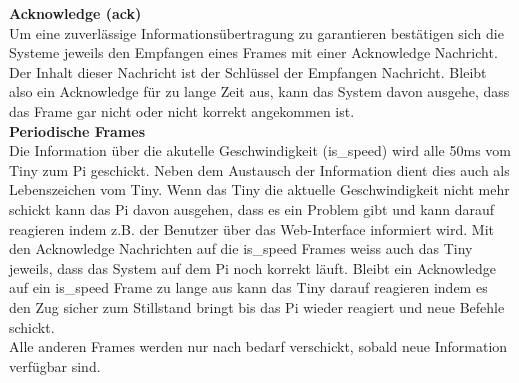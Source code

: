 \documentclass[../../main.tex]{subfiles}
\begin{document}
        \pagebreak

        \textbf{Acknowledge (ack)}\\
        Um eine zuverlässige Informationsübertragung zu garantieren bestätigen sich die Systeme jeweils den Empfangen eines Frames mit einer Acknowledge Nachricht. Der Inhalt dieser Nachricht ist der Schlüssel der Empfangen Nachricht. Bleibt also ein Acknowledge für zu lange Zeit aus, kann das System davon ausgehe, dass das Frame gar nicht oder nicht korrekt angekommen ist.\\

        \textbf{Periodische Frames}\\
        Die Information über die akutelle Geschwindigkeit (is\_speed) wird alle 50ms vom Tiny zum Pi geschickt. Neben dem Austausch der Information dient dies auch als Lebenszeichen vom Tiny. Wenn das Tiny die aktuelle Geschwindigkeit nicht mehr schickt kann das Pi davon ausgehen, dass es ein Problem gibt und kann darauf reagieren indem z.B. der Benutzer über das Web-Interface informiert wird. Mit den Acknowledge Nachrichten auf die is\_speed Frames weiss auch das Tiny jeweils, dass das System auf dem Pi noch korrekt läuft. Bleibt ein Acknowledge auf ein is\_speed Frame zu lange aus kann das Tiny darauf reagieren indem es den Zug sicher zum Stillstand bringt bis das Pi wieder reagiert und neue Befehle schickt.\\
        Alle anderen Frames werden nur nach bedarf verschickt, sobald neue Information verfügbar sind.

    
\end{document}
